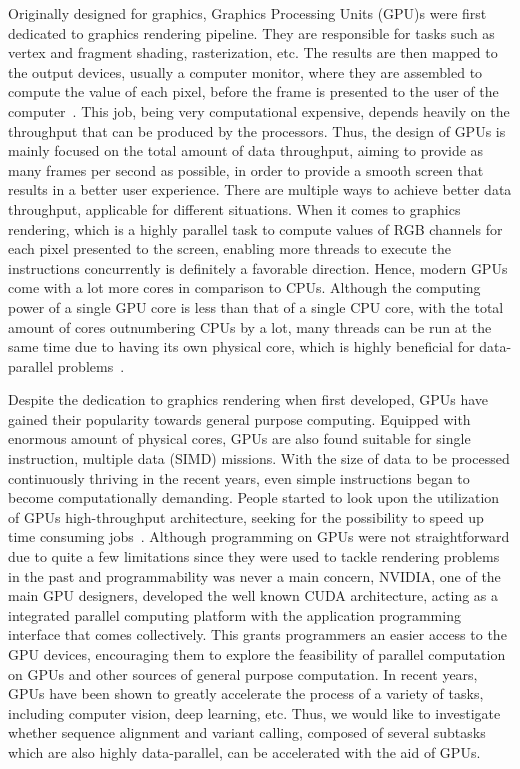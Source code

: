 \documentclass{PHlab-thesis}
\begin{document}
Originally designed for graphics, Graphics Processing Units (GPU)s were first dedicated to graphics rendering pipeline.  They are responsible for tasks such as vertex and fragment shading, rasterization, etc.  The results are then mapped to the output devices, usually a computer monitor, where they are assembled to compute the value of each pixel, before the frame is presented to the user of the computer~\cite{foley1994introduction,owens2008gpu}.  This job, being very computational expensive, depends heavily on the throughput that can be produced by the processors.  Thus, the design of GPUs is mainly focused on the total amount of data throughput, aiming to provide as many frames per second as possible, in order to provide a smooth screen that results in a better user experience.  There are multiple ways to achieve better data throughput, applicable for different situations. When it comes to graphics rendering, which is a highly parallel task to compute values of RGB channels for each pixel presented to the screen, enabling more threads to execute the instructions concurrently is definitely a favorable direction. Hence, modern GPUs come with a lot more cores in comparison to CPUs. Although the computing power of a single GPU core is less than that of a single CPU core, with the total amount of cores outnumbering CPUs by a lot, many threads can be run at the same time due to having its own physical core, which is highly beneficial for data-parallel problems~\cite{navarro2014survey}.

Despite the dedication to graphics rendering when first developed, GPUs have gained their popularity towards general purpose computing. Equipped with enormous amount of physical cores, GPUs are also found suitable for single instruction, multiple data (SIMD) missions. With the size of data to be processed continuously thriving in the recent years, even simple instructions began to become computationally demanding. People started to look upon the utilization of GPUs high-throughput architecture, seeking for the possibility to speed up time consuming jobs~\cite{owens2008gpu,nickolls2010gpu}. Although programming on GPUs were not straightforward due to quite a few limitations since they were used to tackle rendering problems in the past and programmability was never a main concern, NVIDIA, one of the main GPU designers, developed the well known CUDA architecture, acting as a integrated parallel computing platform with the application programming interface that comes collectively. This grants programmers an easier access to the GPU devices, encouraging them to explore the feasibility of parallel computation on GPUs and other sources of general purpose computation. In recent years, GPUs have been shown to greatly accelerate the process of a variety of tasks, including computer vision, deep learning, etc. Thus, we would like to investigate whether sequence alignment and variant calling, composed of several subtasks which are also highly data-parallel, can be accelerated with the aid of GPUs.
\end{document}

